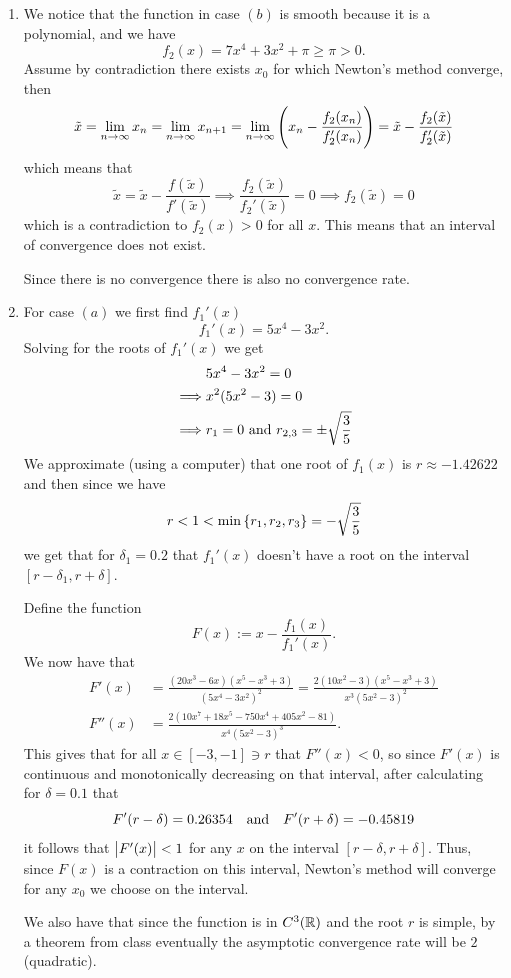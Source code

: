 \documentclass[11pt, a4paper]{article}
\begin{document}
\begin{solution} \phantom{}
\begin{enumerate}
  \item[(b)] We notice that the function in case $(b)$ is smooth
    because it is a polynomial, and we have
    \[
      f_2(x) = 7x^4 + 3x^2 + \pi \geq \pi > 0.
    \]
  Assume by contradiction there exists $x_0$ for which Newton's method
  converge, then
  \[
    \tilde x =
    \lim_{n \to \infty} x_n =
    \lim_{n \to \infty} x_{n+1} =
    \lim_{n \to \infty} \del{x_{n} - \frac{f_2(x_n)}{f_2'(x_n)}} =
    \tilde x - \frac{f_2(\tilde x)}{f_2'(\tilde x)}
  \]
  which means that
  \[
    \tilde x =
    \tilde x - \frac{f(\tilde x)}{f'(\tilde x)}
    \implies
    \frac{f_2(\tilde x)}{f_2'(\tilde x)} = 0
    \implies
    f_2(\tilde x) = 0
  \]
  which is a contradiction to $f_2(x) > 0$ for all $x$.
  This means that an interval of convergence does not exist.

  Since there is no convergence there is also no convergence rate.
  \item[(a)] For case $(a)$ we first find $f_1'(x)$
    \[
      f_1'(x) = 5 x^4 - 3 x^2.
    \]
  Solving for the roots of $f_1'(x)$ we get
  \begin{align*}
             &5 x^4 - 3 x^2 = 0 \\
    \implies &x^2 (5x^2 - 3) = 0 \\ 
      \implies &r_1 = 0 \text{ and } r_{2,3} = \pm \sqrt{\frac{3}{5}}
  \end{align*}
  We approximate (using a computer)
  that one root of $f_1(x)$ is $r \approx -1.42622$ and then
  since we have
  \[
    r < 1 < \min\left\{r_1,r_2,r_3\right\} = - \sqrt{\frac{3}{5}}
  \]
  we get that for $\delta_1 = 0.2$ that $f_1'(x)$ doesn't have a root
  on the interval $[r - \delta_1, r + \delta]$.

  Define the function
  \[
    F(x) := x - \frac{f_1(x)}{f_1'(x)}.
  \]
  We now have that
  \begin{align*}
    F'(x) &=
    \frac{\left(20x^{3} - 6x\right)
    \left(x^{5} - x^{3} + 3\right)}{\left(5x^{4} - 3x^{2}\right)^{2}} =
    \frac{2 \left(10x^{2} - 3\right)
    \left(x^{5} - x^{3} + 3\right)}{x^{3} \left(5x^{2} - 3\right)^{2}} \\
    F''(x) &= \frac{2 \left(10x^{7} + 18x^{5} - 750x^{4} + 405x^{2} - 81\right)}
      {x^{4} \left(5x^{2} - 3\right)^{3}}.
  \end{align*}
  This gives that for all $x \in [-3,-1] \ni r$ that $F''(x) < 0$, so
  since $F'(x)$ is continuous and monotonically decreasing on that interval,
  after calculating for $\delta = 0.1$ that
  \[
    F'(r - \delta) = 0.26354 \quad \text{and} \quad
    F'(r + \delta) = -0.45819
  \]
  it follows that $\left\lvert F'(x)\right\rvert < 1$ for any $x$ on the interval
  $[r - \delta, r + \delta]$.
  Thus, since $F(x)$ is a contraction on this interval, Newton's method
  will converge for any $x_0$ we choose on the interval.

  We also have that since the function is in $C^3(\mathbb{R})$ and the root $r$ is
  simple, by a theorem from class eventually the asymptotic convergence rate
  will be $2$ (quadratic).
\end{enumerate}
\end{solution}
\end{document}
